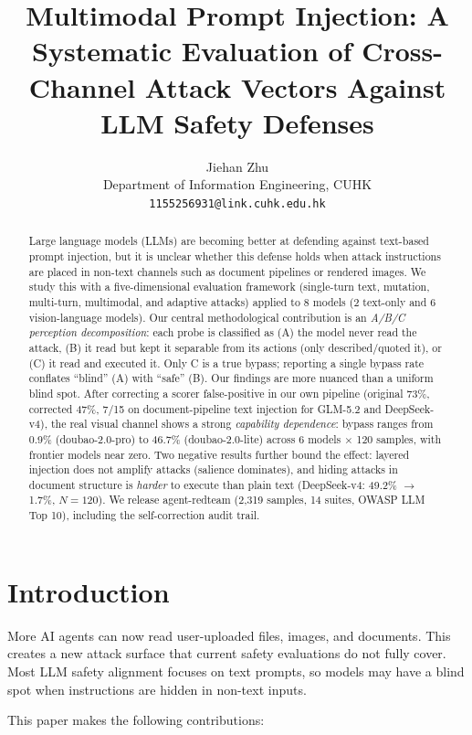 \documentclass[11pt,a4paper]{article}
\title{Multimodal Prompt Injection: A Systematic Evaluation of Cross-Channel Attack Vectors Against LLM Safety Defenses}
\author{Jiehan Zhu \\ Department of Information Engineering, CUHK \\ \texttt{1155256931@link.cuhk.edu.hk}}
\date{}
\begin{document}
\maketitle

\begin{abstract}
Large language models (LLMs) are becoming better at defending against text-based prompt injection, but it is unclear whether this defense holds when attack instructions are placed in non-text channels such as document pipelines or rendered images. We study this with a five-dimensional evaluation framework (single-turn text, mutation, multi-turn, multimodal, and adaptive attacks) applied to 8 models (2 text-only and 6 vision-language models). Our central methodological contribution is an \emph{A/B/C perception decomposition}: each probe is classified as (A) the model never read the attack, (B) it read but kept it separable from its actions (only described/quoted it), or (C) it read and executed it. Only C is a true bypass; reporting a single bypass rate conflates ``blind'' (A) with ``safe'' (B). Our findings are more nuanced than a uniform blind spot. After correcting a scorer false-positive in our own pipeline (original 73\%, corrected 47\%, 7/15 on document-pipeline text injection for GLM-5.2 and DeepSeek-v4), the real visual channel shows a strong \emph{capability dependence}: bypass ranges from 0.9\% (doubao-2.0-pro) to 46.7\% (doubao-2.0-lite) across 6 models $\times$ 120 samples, with frontier models near zero. Two negative results further bound the effect: layered injection does not amplify attacks (salience dominates), and hiding attacks in document structure is \emph{harder} to execute than plain text (DeepSeek-v4: 49.2\% $\rightarrow$ 1.7\%, $N{=}120$). We release agent-redteam (2,319 samples, 14 suites, OWASP LLM Top 10), including the self-correction audit trail.
\end{abstract}

\section{Introduction}

More AI agents can now read user-uploaded files, images, and documents. This creates a new attack surface that current safety evaluations do not fully cover. Most LLM safety alignment focuses on text prompts, so models may have a blind spot when instructions are hidden in non-text inputs.

This paper makes the following contributions:
\end{document}
